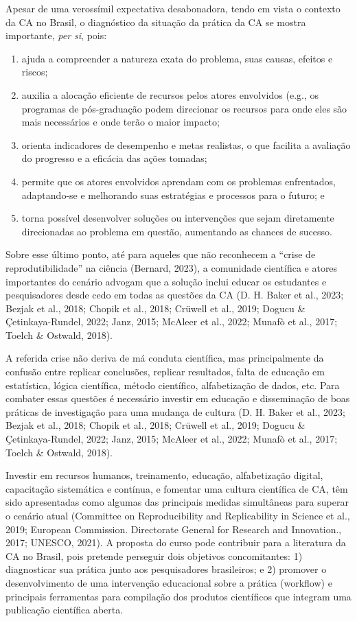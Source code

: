 \documentclass[
  a4paper,
]{article}
\begin{document}
Apesar de uma verossímil expectativa desabonadora, tendo em vista o
contexto da CA no Brasil, o diagnóstico da situação da prática da CA se
mostra importante, \emph{per si}, pois:

\begin{enumerate}
\def\labelenumi{\arabic{enumi}.}
\item
  ajuda a compreender a natureza exata do problema, suas causas, efeitos
  e riscos;
\item
  auxilia a alocação eficiente de recursos pelos atores envolvidos
  (e.g., os programas de pós-graduação podem direcionar os recursos para
  onde eles são mais necessários e onde terão o maior impacto;
\item
  orienta indicadores de desempenho e metas realistas, o que facilita a
  avaliação do progresso e a eficácia das ações tomadas;
\item
  permite que os atores envolvidos aprendam com os problemas
  enfrentados, adaptando-se e melhorando suas estratégias e processos
  para o futuro; e
\item
  torna possível desenvolver soluções ou intervenções que sejam
  diretamente direcionadas ao problema em questão, aumentando as chances
  de sucesso.
\end{enumerate}

Sobre esse último ponto, até para aqueles que não reconhecem a ``crise
de reprodutibilidade'' na ciência (Bernard, 2023), a comunidade
científica e atores importantes do cenário advogam que a solução inclui
educar os estudantes e pesquisadores desde cedo em todas as questões da
CA (D. H. Baker et al., 2023; Bezjak et al., 2018; Chopik et al., 2018;
Crüwell et al., 2019; Dogucu \& Çetinkaya-Rundel, 2022; Janz, 2015;
McAleer et al., 2022; Munafò et al., 2017; Toelch \& Ostwald, 2018).

A referida crise não deriva de má conduta científica, mas principalmente
da confusão entre replicar conclusões, replicar resultados, falta de
educação em estatística, lógica científica, método científico,
alfabetização de dados, etc. Para combater essas questões é necessário
investir em educação e disseminação de boas práticas de investigação
para uma mudança de cultura (D. H. Baker et al., 2023; Bezjak et al.,
2018; Chopik et al., 2018; Crüwell et al., 2019; Dogucu \&
Çetinkaya-Rundel, 2022; Janz, 2015; McAleer et al., 2022; Munafò et al.,
2017; Toelch \& Ostwald, 2018).

Investir em recursos humanos, treinamento, educação, alfabetização
digital, capacitação sistemática e contínua, e fomentar uma cultura
científica de CA, têm sido apresentadas como algumas das principais
medidas simultâneas para superar o cenário atual (Committee on
Reproducibility and Replicability in Science et al., 2019; European
Commission. Directorate General for Research and Innovation., 2017;
UNESCO, 2021). A proposta do curso pode contribuir para a literatura da
CA no Brasil, pois pretende perseguir dois objetivos concomitantes: 1)
diagnosticar sua prática junto aos pesquisadores brasileiros; e 2)
promover o desenvolvimento de uma intervenção educacional sobre a
prática (workflow) e principais ferramentas para compilação dos produtos
científicos que integram uma publicação científica aberta.
\end{document}
